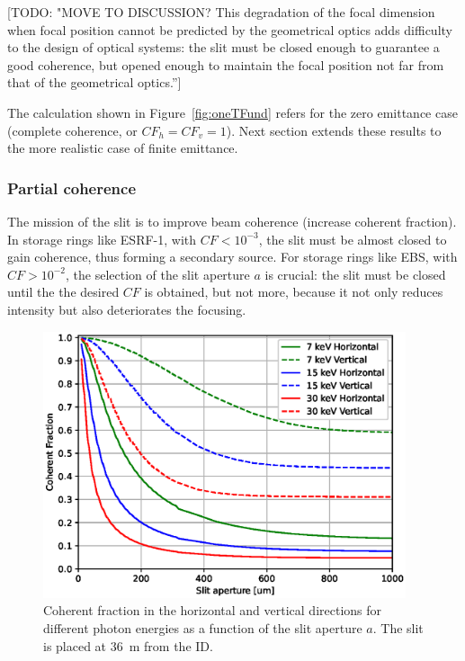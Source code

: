 \documentclass{iucr}              %
\newcommand{\todo}[1]{{\color{red}[TODO: "#1'']}}
\begin{document}
\todo{MOVE TO DISCUSSION? This degradation of the focal dimension when focal position cannot be predicted by the geometrical optics adds difficulty to the design of optical systems: the slit must be closed enough to guarantee a good coherence, but opened enough to maintain the focal position not far from that of the geometrical optics.} 


The calculation shown in Figure~\ref{fig:oneTFund} refers for the zero emittance case (complete coherence, or $CF_h=CF_v=1$). Next section extends these results to the more realistic case of finite emittance.

\subsubsection{Partial coherence} The mission of the slit is to improve beam coherence (increase coherent fraction). In storage rings like ESRF-1, with $CF<10^{-3}$, the slit must be almost closed to gain coherence, thus forming a secondary source. For storage rings like EBS, with $CF > 10^{-2}$, the selection of the slit aperture $a$ is crucial: the slit must be closed until the the desired $CF$ is obtained, but not more, because it not only reduces intensity but also deteriorates the focusing. 

\begin{figure}
    \centering
    \includegraphics[width=0.95\textwidth]{figures/cf_vs_aperture.eps}

    \caption{
    Coherent fraction in the horizontal and vertical directions for different photon energies as a function of the slit aperture $a$. The slit is placed at \SI{36}{\meter} from the ID. 
    }
    \label{fig:cf_vs_aperture}
\end{figure}
\end{document}
